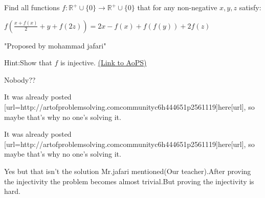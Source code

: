 \begin{problem}
	Find all functions $f: \mathbb{R}^+ \cup \{0\} \to \mathbb{R}^+ \cup \{0\}$ that for any non-negative $x,y,z$ satisfy:

$f(\frac{x+f(x)}{2}+y+f(2z))=2x-f(x)+f(f(y))+2f(z)$

"Proposed by mohammad jafari"

Hint:Show that $f$ is injective.
	\flushright \href{https://artofproblemsolving.com/community/c6h1588727}{(Link to AoPS)}
\end{problem}



\begin{solution}
	Nobody??
\end{solution}



\begin{solution}
	It was already posted [url=http://artofproblemsolving.com\/community\/c6h444651p2561119]here[\/url], so maybe that's why no one's solving it.
\end{solution}



\begin{solution}
	\begin{tcolorbox}It was already posted [url=http://artofproblemsolving.com\/community\/c6h444651p2561119]here[\/url], so maybe that's why no one's solving it.\end{tcolorbox}

Yes but that isn't the solution Mr.jafari mentioned(Our teacher).After proving the injectivity the problem becomes almost trivial.But proving the injectivity is hard.
\end{solution}






